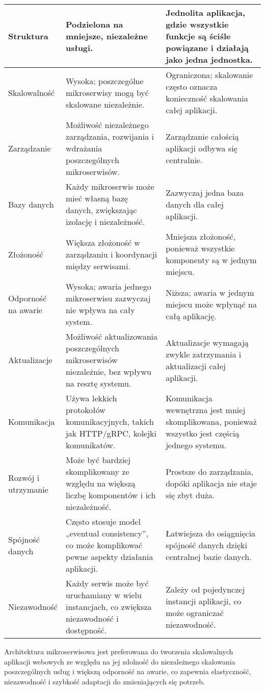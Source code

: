 \begin{longtable}{| m{0.2\linewidth} | m{0.4\linewidth} | m{0.4\linewidth} |}
    Struktura & Podzielona na mniejsze, niezależne usługi. & Jednolita aplikacja, gdzie wszystkie funkcje są ściśle powiązane i działają jako jedna jednostka. \\ \hline
    Skalowalność & Wysoka; poszczególne mikroserwisy mogą być skalowane niezależnie. & Ograniczona; skalowanie często oznacza konieczność skalowania całej aplikacji. \\ \hline
    Zarządzanie & Możliwość niezależnego zarządzania, rozwijania i wdrażania poszczególnych mikroserwisów. & Zarządzanie całością aplikacji odbywa się centralnie. \\ \hline
    Bazy danych & Każdy mikroserwis może mieć własną bazę danych, zwiększając izolację i niezależność. & Zazwyczaj jedna baza danych dla całej aplikacji. \\ \hline
    Złożoność & Większa złożoność w zarządzaniu i koordynacji między serwisami. & Mniejsza złożoność, ponieważ wszystkie komponenty są w jednym miejscu. \\ \hline
    Odporność na awarie & Wysoka; awaria jednego mikroserwisu zazwyczaj nie wpływa na cały system. & Niższa; awaria w jednym miejscu może wpłynąć na całą aplikację. \\ \hline
    Aktualizacje & Możliwość aktualizowania poszczególnych mikroserwisów niezależnie, bez wpływu na resztę systemu. & Aktualizacje wymagają zwykle zatrzymania i aktualizacji całej aplikacji. \\ \hline
    Komunikacja & Używa lekkich protokołów komunikacyjnych, takich jak HTTP/gRPC, kolejki komunikatów. & Komunikacja wewnętrzna jest mniej skomplikowana, ponieważ wszystko jest częścią jednego systemu. \\ \hline
    Rozwój i utrzymanie	& Może być bardziej skomplikowany ze względu na większą liczbę komponentów i ich niezależność. & Prostsze do zarządzania, dopóki aplikacja nie staje się zbyt duża. \\ \hline
    Spójność danych & Często stosuje model „eventual consistency”, co może komplikować pewne aspekty działania aplikacji. & Łatwiejsza do osiągnięcia spójność danych dzięki centralnej bazie danych. \\ \hline
    Niezawodność  & Każdy serwis może być uruchamiany w wielu instancjach, co zwiększa niezawodność i dostępność.		 & Zależy od pojedynczej instancji aplikacji, co może ograniczać niezawodność.
    \\ \hline
\end{longtable}

Architektura mikroserwisowa jest preferowana do tworzenia skalowalnych aplikacji webowych ze względu na jej zdolność do niezależnego skalowania poszczególnych usług i większą odporność na awarie, co zapewnia elastyczność, niezawodność i szybkość adaptacji do zmieniających się potrzeb.


